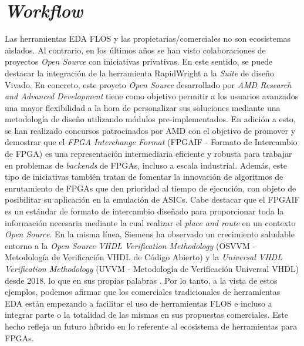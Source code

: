 \hspace{10 mm}

\section{\textit{Workflow}}

\label{Workf}

Las herramientas EDA FLOS y las propietarias/comerciales no son ecosistemas aislados.
Al contrario, en los últimos años se han visto colaboraciones de proyectos \textit{Open Source} con iniciativas privativas.
En este sentido, se puede destacar la integración de la herramienta RapidWright \cite{gh:rapid} a la \textit{Suite} de diseño Vivado.
En concreto, este proyeto \textit{Open Source} desarrollado por \textit{AMD Research and Advanced Development} tiene como objetivo permitir a los usuarios avanzados una mayor flexibilidad a la hora de personalizar sus soluciones mediante una metodología de diseño utilizando módulos pre-implementados.
En adición a esto, se han realizado concursos \cite{contest} patrocinados por AMD con el objetivo de promover y demostrar que el \textit{FPGA Interchange Format} (FPGAIF - Formato de Intercambio de FPGA) \cite{FPGAIF} es una representación intermediaria eficiente y robusta para trabajar en problemas de \textit{backends} de FPGAs, incluso a escala industrial.
Además, este tipo de iniciativas también tratan de fomentar la innovación de algoritmos de enrutamiento de FPGAs que den prioridad al tiempo de ejecución, con objeto de posibilitar su aplicación en la emulación de ASICs.
Cabe destacar que el FPGAIF es un estándar de formato de intercambio diseñado para proporcionar toda la información necesaria mediante la cual realizar el \textit{place and route} en un contexto \textit{Open Source}.
En la misma línea, Siemens ha observado un crecimiento saludable entorno a la \textit{Open Source VHDL Verification Methodology} (OSVVM - Metodología de Verificación VHDL de Código Abierto) \cite{osvvm} y la \textit{Universal VHDL Verification Methodology} (UVVM -  Metodología de Verificación Universal VHDL) \cite{uvvm} desde 2018, lo que en sus propias palabras  \cite{wilson-research}.
Por lo tanto, a la vista de estos ejemplos, podemos afirmar que los comerciales tradicionales de herramientas EDA están empezando a facilitar el uso de herramientas FLOS e incluso a integrar parte o la totalidad de las mismas en sus propuestas comerciales.
Este hecho refleja un futuro híbrido en lo referente al ecosistema de herramientas para FPGAs.

